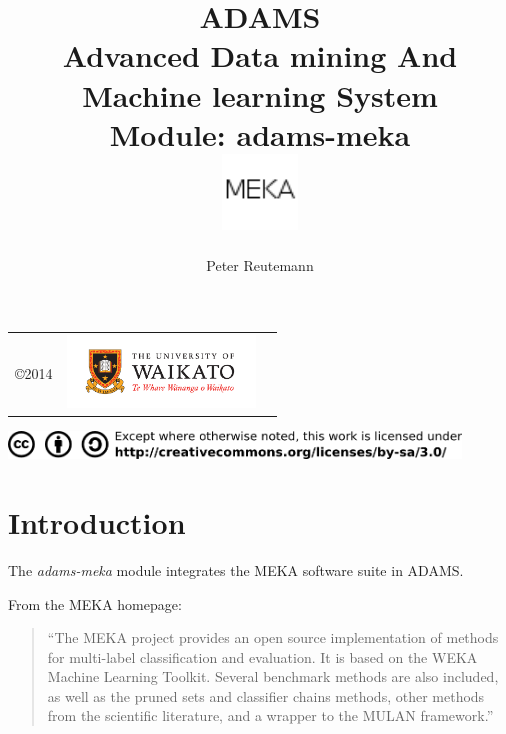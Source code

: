 \documentclass[a4paper]{book}
\title{
  \textbf{ADAMS} \\
  {\Large \textbf{A}dvanced \textbf{D}ata mining \textbf{A}nd \textbf{M}achine
  learning \textbf{S}ystem} \\
  {\Large Module: adams-meka} \\
  \vspace{1cm}
  \includegraphics[width=2cm]{images/meka-module.png} \\
}
\author{
  Peter Reutemann
}
\begin{document}
\begin{titlepage}
\maketitle

\thispagestyle{empty}
\center
\begin{table}[b]
	\begin{tabular}{c l l}
		\parbox[c][2cm]{2cm}{\copyright 2014} &
		\parbox[c][2cm]{5cm}{\includegraphics[width=5cm]{images/coat_of_arms.pdf}} \\
	\end{tabular}
	\includegraphics[width=12cm]{images/cc.png} \\
\end{table}

\end{titlepage}

\tableofcontents
\listoffigures

\chapter{Introduction}
The \textit{adams-meka} module integrates the MEKA \cite{meka} software suite 
in ADAMS.

\noindent From the MEKA homepage:
\begin{quote}
``The MEKA project provides an open source implementation of methods for 
multi-label classification and evaluation. It is based on the WEKA Machine 
Learning Toolkit. Several benchmark methods are also included, as well as the 
pruned sets and classifier chains methods, other methods from the scientific 
literature, and a wrapper to the MULAN framework.''
\end{quote}

\end{document}
